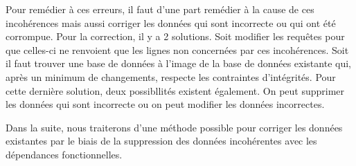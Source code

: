 \documentclass[12pt, a4paper, oneside, titlepage]{book}%
\begin{document}
Pour remédier à ces erreurs, il faut d'une part remédier à la cause de ces incohérences mais aussi corriger les données qui sont incorrecte ou qui ont été corrompue. Pour la correction, il y a 2 solutions. Soit modifier les requêtes pour que celles-ci ne renvoient que les lignes non concernées par ces incohérences. Soit il faut trouver une base de données à l’image de la base de données existante qui, après un minimum de changements, respecte les contraintes d’intégrités. Pour cette dernière solution, deux possibllités existent également. On peut supprimer les données qui sont incorrecte ou on peut modifier les données incorrectes.

Dans la suite, nous traiterons d'une méthode possible pour corriger les données existantes par le biais de la suppression des données incohérentes avec les dépendances fonctionnelles.
\end{document}
